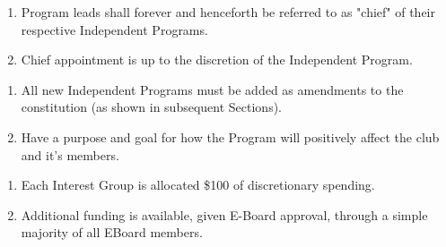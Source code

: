 


\begin{enumerate}
  \item Program leads shall forever and henceforth be referred to as "chief" of
    their respective Independent Programs.
  \item Chief appointment is up to the discretion of the Independent Program.
\end{enumerate}


\begin{enumerate}
  \item All new Independent Programs must be added as amendments to the
    constitution (as shown in subsequent Sections).
  \item Have a purpose and goal for how the Program will positively affect the
    club and it’s members.
\end{enumerate}


\begin{enumerate}
  \item Each Interest Group is allocated \$100 of discretionary spending.
  \item Additional funding is available, given E-Board approval, through a 
    simple majority of all EBoard members.
\end{enumerate}




